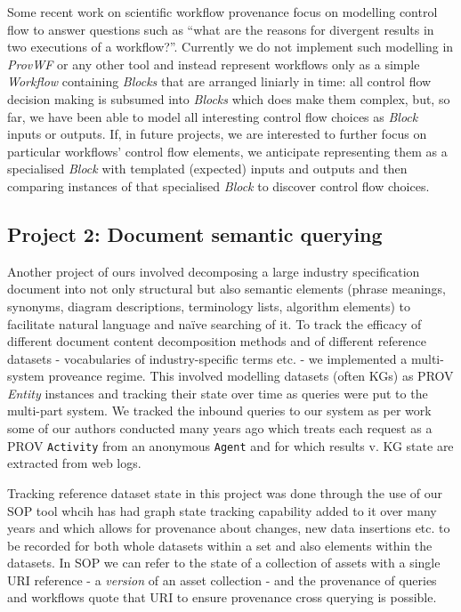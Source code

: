 \documentclass[letterpaper,twocolumn,10pt]{article}
\begin{document}
Some recent work on scientific workflow provenance \cite{butt_provenance_2021} focus on modelling control flow to 
answer questions such as ``what are the reasons for divergent results in two executions of a workflow?''. Currently we do not implement such 
modelling in \textit{ProvWF} or any other tool and instead represent workflows only as a simple \textit{Workflow} containing \textit{Blocks} that are 
arranged liniarly in time: all control flow decision making is subsumed into \textit{Blocks} which does make them complex, but, so far, we have been 
able to model all interesting control flow choices as \textit{Block} inputs or outputs. If, in future projects, we are interested to further focus on
particular workflows' control flow elements, we anticipate representing them as a specialised \textit{Block} with templated (expected) inputs and 
outputs and then comparing instances of that specialised \textit{Block} to discover control flow choices.

\subsection{Project 2: Document semantic querying}
Another project of ours involved decomposing a large industry specification document into not only structural but also semantic elements (phrase
meanings, synonyms, diagram descriptions, terminology lists, algorithm elements) to facilitate natural language and na\"ive searching of it. To track
the efficacy of different document content decomposition methods and of different reference datasets - vocabularies of industry-specific terms etc. - 
we implemented a multi-system proveance regime. This involved modelling datasets (often KGs) as PROV \textit{Entity} instances and tracking their 
state over time as queries were put to the multi-part system. We tracked the inbound queries to our system as per work some of our authors conducted 
many years ago \cite{car_enabling_2016} which treats each request as a PROV \texttt{Activity} from an anonymous \texttt{Agent} and for which results v. KG state are extracted from web logs.

Tracking reference dataset state in this project was done through the use of our SOP tool whcih has had graph state tracking capability added to 
it over many years and which allows for provenance about changes, new data insertions etc. to be recorded for both whole datasets within a set and 
also elements within the datasets. In SOP we can refer to the state of a collection of assets with a single URI reference - a \textit{version} of an asset collection - and the provenance of queries and workflows quote that URI to ensure provenance cross querying is possible. 
\end{document}
